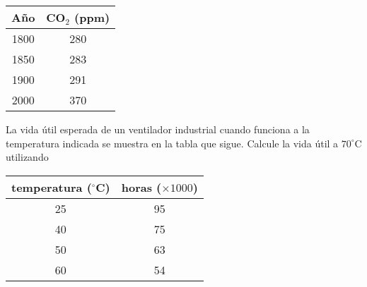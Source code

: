 \begin{questions}
    \begin{table}[ht!]
        \centering
        \begin{tabular}{|c|c|}
            \hline
            Año  & CO$_{2}$ (ppm)
            \\
            \hline
            1800 & 280
            \\
            \hline
            1850 & 283
            \\
            \hline
            1900 & 291
            \\
            \hline
            2000 & 370            \\
            \hline
        \end{tabular}
    \end{table}

    \question

    La vida útil esperada de un ventilador industrial cuando funciona
    a la temperatura indicada se muestra en la tabla que sigue.
    Calcule la vida útil a $70^{\circ}$C utilizando

    \begin{multicols}{2}
    \end{multicols}

    \begin{table}[ht!]
        \centering
        \begin{tabular}{|c|c|}
            \hline
            temperatura ($^{\circ}$C) & horas ($\times 1000$)
            \\
            \hline
            25                        & 95
            \\
            \hline
            40                        & 75
            \\
            \hline
            50                        & 63
            \\
            \hline
            60                        & 54                    \\
            \hline
        \end{tabular}
    \end{table}


\end{questions}
